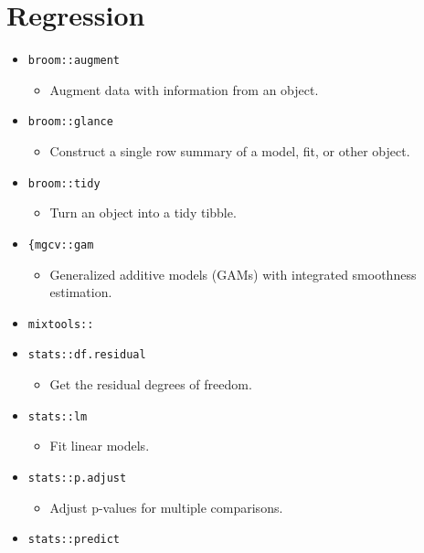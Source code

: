 \documentclass[
]{book}
\providecommand{\tightlist}{%
  \setlength{\itemsep}{0pt}\setlength{\parskip}{0pt}}
\begin{document}
\hypertarget{regression}{%
\section{Regression}\label{regression}}

\begin{itemize}
\tightlist
\item
  \texttt{broom::augment}

  \begin{itemize}
  \tightlist
  \item
    Augment data with information from an object.
  \end{itemize}
\item
  \texttt{broom::glance}

  \begin{itemize}
  \tightlist
  \item
    Construct a single row summary of a model, fit, or other object.
  \end{itemize}
\item
  \texttt{broom::tidy}

  \begin{itemize}
  \tightlist
  \item
    Turn an object into a tidy tibble.
  \end{itemize}
\item
  \texttt{\{mgcv::gam}

  \begin{itemize}
  \tightlist
  \item
    Generalized additive models (GAMs) with integrated smoothness estimation.
  \end{itemize}
\item
  \texttt{mixtools::}
\item
  \texttt{stats::df.residual}

  \begin{itemize}
  \tightlist
  \item
    Get the residual degrees of freedom.
  \end{itemize}
\item
  \texttt{stats::lm}

  \begin{itemize}
  \tightlist
  \item
    Fit linear models.
  \end{itemize}
\item
  \texttt{stats::p.adjust}

  \begin{itemize}
  \tightlist
  \item
    Adjust p-values for multiple comparisons.
  \end{itemize}
\item
  \texttt{stats::predict}


\end{itemize}
\end{document}
